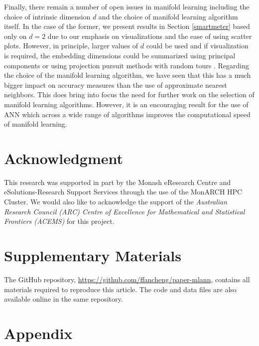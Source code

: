 \documentclass[11pt,a4paper,]{article}
\begin{document}
Finally, there remain a number of open issues in manifold learning including the choice of intrinsic dimension \(d\) and the choice of manifold learning algorithm itself. In the case of the former, we present results in Section \ref{smartmeter} based only on \(d=2\) due to our emphasis on visualizations and the ease of using scatter plots. However, in principle, larger values of \(d\) could be used and if visualization is required, the embedding dimensions could be summarized using principal components or using projection pursuit methods with random tours \autocite{Cook1995-jx,Laa2020-qx}. Regarding the choice of the manifold learning algorithm, we have seen that this has a much bigger impact on accuracy measures than the use of approximate nearest neighbors. This does bring into focus the need for further work on the selection of manifold learning algorithms. However, it is an encouraging result for the use of ANN which across a wide range of algorithms improves the computational speed of manifold learning.

\hypertarget{acknowledgment}{%
\section*{Acknowledgment}\label{acknowledgment}}

This research was supported in part by the Monash eResearch Centre and eSolutions-Research Support Services through the use of the MonARCH HPC Cluster.
We would also like to acknowledge the support of the \emph{Australian Research Council (ARC) Centre of Excellence for Mathematical and Statistical Frontiers (ACEMS)} for this project.

\hypertarget{supplementary-materials}{%
\section*{Supplementary Materials}\label{supplementary-materials}}

The GitHub repository, \url{https://github.com/ffancheng/paper-mlann}, contains all materials required to reproduce this article. The code and data files are also available online in the same repository.

\clearpage

\printbibliography

\clearpage\appendix
\section{Appendix}
\def\thepage{A\arabic{page}}
\end{document}
